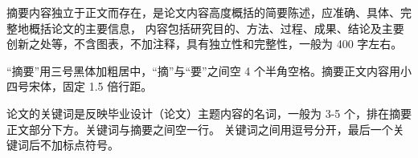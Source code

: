 摘要内容独立于正文而存在，是论文内容高度概括的简要陈述，应准确、具体、完整地概括论文的主要信息，
内容包括研究目的、方法、过程、成果、结论及主要创新之处等，不含图表，不加注释，具有独立性和完整性，一般为 400 字左右。

“摘要”用三号黑体加粗居中，“摘”与“要”之间空 4 个半角空格。摘要正文内容用小四号宋体，固定 1.5 倍行距。

论文的关键词是反映毕业设计（论文）主题内容的名词，一般为 3-5 个，排在摘要正文部分下方。关键词与摘要之间空一行。
关键词之间用逗号分开，最后一个关键词后不加标点符号。